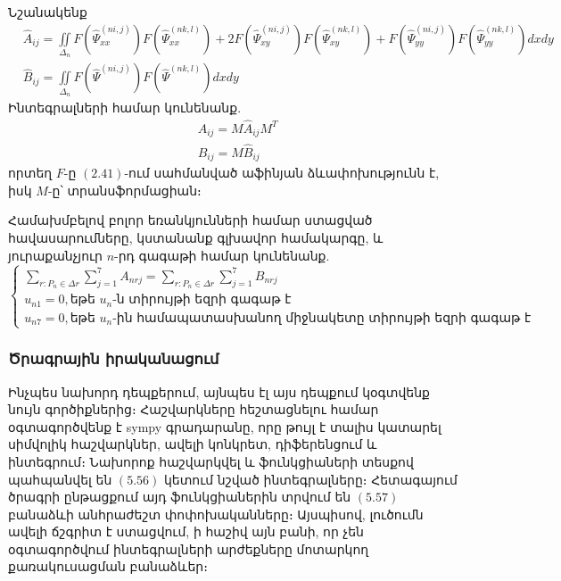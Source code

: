 \documentclass[fleqn, bachelor,subf,12pt,notitlepage]{article}
\begin{document}
Նշանակենք
\begin{equation}
\begin{aligned}
&\hat{A}_{ij} = \iint \limits_{\Delta_{n}} F\left(\hat{\Psi}^{(ni,j)}_{xx}\right)F\left(\hat{\Psi}^{(nk,l)}_{xx}\right) + 2F\left(\hat{\Psi}^{(ni,j)}_{xy}\right)F\left(\hat{\Psi}^{(nk,l)}_{xy}\right) + F\left(\hat{\Psi}^{(ni,j)}_{yy}\right)F\left(\hat{\Psi}^{(nk,l)}_{yy}\right)dxdy \\
&\hat{B}_{ij} = \iint \limits_{\Delta_{n}} F\left(\hat{\Psi}^{(ni,j)}\right)F\left(\hat{\Psi}^{(nk,l)}\right)dxdy
\end{aligned}
\end{equation}
 Ինտեգրալների համար կունենանք.
\begin{equation}
\begin{aligned}
& A_{ij} = M\hat{A}_{ij}M^{T} \\
& B_{ij} = M\hat{B}_{ij}
\end{aligned}
\end{equation}
որտեղ $F$-ը $(2.41)$-ում սահմանված աֆինյան ձևափոխությունն է, իսկ $M$-ը՝ տրանսֆորմացիան։

Համախմբելով բոլոր եռանկյունների համար ստացված հավասարումները, կստանանք գլխավոր համակարգը, և յուրաքանչյուր $n$-րդ գագաթի համար կունենանք.
\begin{equation}
\begin{cases}
\sum_{r: P_{n}\in \Delta{r}}\sum_{j=1}^{7}  A_{nrj} = \sum_{r: P_{n}\in \Delta{r}}\sum_{j=1}^{7}B_{nrj}\\
u_{n1} = 0, \text{եթե } u_{n}\text{-ն տիրույթի եզրի գագաթ է} \\
u_{n7} = 0, \text{եթե } u_{n}\text{-ին համապատասխանող միջնակետը տիրույթի եզրի գագաթ է}
\end{cases}
\end{equation}

\newpage
\subsubsection*{{Ծրագրային իրականացում}}

Ինչպես նախորդ դեպքերում, այնպես էլ այս դեպքում կօգտվենք նույն գործիքներից։
Հաշվարկները հեշտացնելու համար օգտագործվենք է sympy գրադարանը, որը թույլ է տալիս կատարել սիմվոլիկ հաշվարկներ, ավելի կոնկրետ, դիֆերենցում և ինտեգրում։ Նախորոք հաշվարկվել և ֆունկցիաների տեսքով պահպանվել են $(5.56)$ կետում նշված ինտեգրալները։ Հետագայում ծրագրի ընթացքում այդ ֆունկցիաներին տրվում են $(5.57)$ բանաձևի անհրաժեշտ փոփոխականները։ Այսպիսով, լուծումն ավելի ճշգրիտ է ստացվում, ի հաշիվ այն բանի, որ չեն օգտագործվում ինտեգրալների արժեքները մոտարկող քառակուսացման բանաձևեր։
\end{document}
